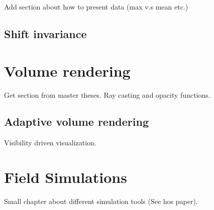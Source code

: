 Add section about how to present data (max v.s mean etc.)
						
\subsection{Shift invariance}

\section{Volume rendering}

Get section from master theses. Ray casting and opacity functions.

\subsection{Adaptive volume rendering}

Visibility driven visualization.

\section{Field Simulations}

Small chapter about different simulation tools (See hos paper).
			
\endinput
